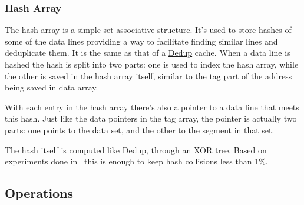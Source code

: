 \subsubsection{Hash Array}
\label{sssec:DedupBDIHash}
The hash array is a simple set associative structure. It's used to store hashes of some of the data lines providing a way to facilitate finding similar lines and deduplicate them. It is the same as that of a \hyperref[sssec:DedupHash]{Dedup} cache. When a data line is hashed the hash is split into two parts: one is used to index the hash array, while the other is saved in the hash array itself, similar to the tag part of the address being saved in data array.\par
With each entry in the hash array there's also a pointer to a data line that meets this hash. Just like the data pointers in the tag array, the pointer is actually two parts: one points to the data set, and the other to the segment in that set.\par
The hash itself is computed like \hyperref[sssec:DedupHash]{Dedup}, through an XOR tree. Based on experiments done in~\cite{dedup} this is enough to keep hash collisions less than 1\%.

\subsection{Operations}
\label{ssec:DedupBDIOperations}
